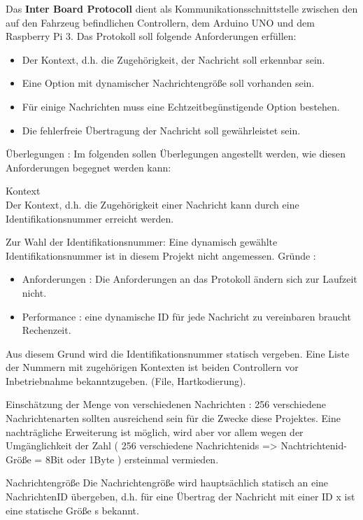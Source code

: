 
Das \textbf{Inter Board Protocoll} dient als Kommunikationsschnittstelle zwischen den auf den Fahrzeug befindlichen Controllern, dem Arduino UNO und dem Raspberry Pi 3. Das Protokoll soll folgende Anforderungen erfüllen:

\begin{itemize}

\item Der Kontext, d.h. die Zugehörigkeit, der Nachricht soll erkennbar sein.
\item Eine Option mit dynamischer Nachrichtengröße soll vorhanden sein.
\item Für einige Nachrichten muss eine Echtzeitbegünstigende Option bestehen.
\item Die fehlerfreie Übertragung der Nachricht soll gewährleistet sein.

\end{itemize}

\LARGE Überlegungen : 
\normalsize
Im folgenden sollen Überlegungen angestellt werden, wie diesen Anforderungen begegnet werden kann:

\Large Kontext \\
\normalsize
Der Kontext, d.h. die Zugehörigkeit einer Nachricht kann durch eine Identifikationsnummer erreicht werden.

Zur Wahl der Identifikationsnummer: Eine dynamisch gewählte Identifikationsnummer ist in diesem Projekt nicht angemessen. Gründe :

\begin{itemize}
\item Anforderungen : Die Anforderungen an das Protokoll ändern sich zur Laufzeit nicht.
\item Performance : eine dynamische ID für jede Nachricht zu vereinbaren braucht Rechenzeit.
\end{itemize}

Aus diesem Grund wird die Identifikationsnummer statisch vergeben. Eine Liste der Nummern mit zugehörigen Kontexten ist beiden Controllern vor Inbetriebnahme bekanntzugeben. (File, Hartkodierung).

Einschätzung der Menge von verschiedenen Nachrichten :
256 verschiedene Nachrichtenarten sollten ausreichend sein für die Zwecke diese Projektes. Eine nachträgliche Erweiterung ist möglich, wird aber vor allem wegen der Umgänglichkeit der Zahl ( 256 verschiedene Nachrichtenids => Nachtrichtenid-Größe = 8Bit oder 1Byte ) ersteinmal vermieden.

\Large Nachrichtengröße
\normalsize
Die Nachrichtengröße wird hauptsächlich statisch an eine NachrichtenID übergeben, d.h. für eine Übertrag der Nachricht mit einer ID x ist eine statische Größe s bekannt.

